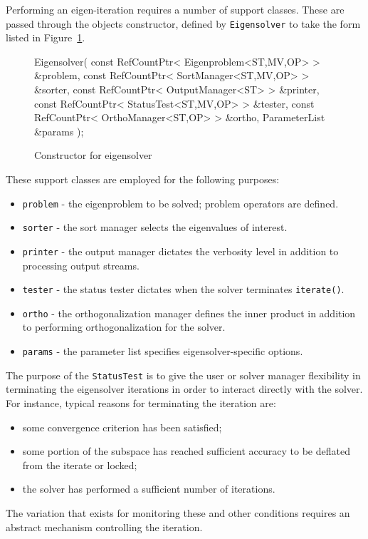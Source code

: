 \documentclass[acmtoms]{acmtrans2m}
\newcommand{\aspace}[1]{\texttt{#1}}
\begin{document}
Performing an eigen-iteration requires a number of support classes.  These are passed
through the objects constructor, defined by \aspace{Eigensolver} to take the form listed
in Figure~\ref{fig:constructor}.

\begin{figure}[htb]
\begin{center}
\begin{boxedverbatim}
Eigensolver(
   const RefCountPtr< Eigenproblem<ST,MV,OP> > &problem,
   const RefCountPtr< SortManager<ST,MV,OP>  > &sorter,
   const RefCountPtr< OutputManager<ST>      > &printer,
   const RefCountPtr< StatusTest<ST,MV,OP>   > &tester,
   const RefCountPtr< OrthoManager<ST,OP>    > &ortho,
   ParameterList                               &params
 );
\end{boxedverbatim}
\end{center}
\caption{Constructor for eigensolver}
\label{fig:constructor}
\end{figure}

These support classes are employed for the following purposes:
\begin{itemize}
  \item \verb!problem! - the eigenproblem to be solved; problem operators are
  defined.
  \item \verb!sorter! - the sort manager selects the
  eigenvalues of interest.
  \item \verb!printer! - the output manager dictates the verbosity level in addition to
    processing output streams.
  \item \verb!tester! - the status tester dictates when the solver terminates
  \verb!iterate()!.
  \item \verb!ortho! - the orthogonalization manager defines the inner product
   in addition to performing orthogonalization for the solver.
  \item \verb!params! - the parameter list specifies eigensolver-specific
  options.
\end{itemize}

The purpose of the \aspace{StatusTest} is to give the user or solver
manager flexibility in terminating the eigensolver iterations in
order to interact directly with the solver. For instance, typical
reasons for terminating the iteration are:
\begin{itemize}
  \item some convergence criterion has been satisfied;
  \item some portion of the subspace has reached sufficient accuracy to be
  deflated from the iterate or locked;
  \item the solver has performed a sufficient number of iterations.
\end{itemize}
The variation that exists for monitoring these and other conditions requires an abstract mechanism
controlling the iteration.
\end{document}
